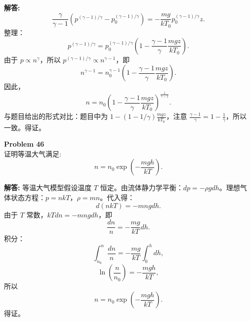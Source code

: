 \documentclass[12pt, a4paper, oneside]{ctexart}
\newenvironment{solution}{\par\noindent\textbf{解答:}\quad}{\par}
\begin{document}
\begin{solution}
    \[
    \frac{\gamma}{\gamma-1} \left( p^{(\gamma-1)/\gamma} - p_0^{(\gamma-1)/\gamma} \right) = -\frac{m g}{k T_0} p_0^{(\gamma-1)/\gamma} z.
    \]
    整理：
    \[
    p^{(\gamma-1)/\gamma} = p_0^{(\gamma-1)/\gamma} \left(1 - \frac{\gamma-1}{\gamma} \frac{m g z}{k T_0} \right).
    \]
    由于 $p \propto n^\gamma$，所以 $p^{(\gamma-1)/\gamma} \propto n^{\gamma-1}$，即
    \[
    n^{\gamma-1} = n_0^{\gamma-1} \left(1 - \frac{\gamma-1}{\gamma} \frac{m g z}{k T_0} \right).
    \]
    因此，
    \[
    n = n_0 \left(1 - \frac{\gamma-1}{\gamma} \frac{m g z}{k T_0} \right)^{\frac{1}{\gamma-1}}.
    \]
    与题目给出的形式对比：题目中为 $1 - (1 - 1/\gamma) \frac{m g z}{k T_0}$，注意 $\frac{\gamma-1}{\gamma} = 1 - \frac{1}{\gamma}$，所以一致。得证。
\end{solution}

\begin{mdframed}[backgroundcolor=gray!10, linewidth=0pt]
    \textbf{Problem 46} \\
    证明等温大气满足:
    \[
    n = n_0 \exp\left(-\frac{m g h}{k T}\right).
    \]
\end{mdframed}
\begin{solution}
    等温大气模型假设温度 $T$ 恒定。由流体静力学平衡：$dp = -\rho g dh$。理想气体状态方程：$p = n k T$，$\rho = m n$。代入得：
    \[
    d(n k T) = -m n g dh.
    \]
    由于 $T$ 常数，$k T dn = -m n g dh$，即
    \[
    \frac{dn}{n} = -\frac{m g}{k T} dh.
    \]
    积分：
    \[
    \int_{n_0}^{n} \frac{dn}{n} = -\frac{m g}{k T} \int_0^h dh,
    \]
    \[
    \ln\left(\frac{n}{n_0}\right) = -\frac{m g h}{k T},
    \]
    所以
    \[
    n = n_0 \exp\left(-\frac{m g h}{k T}\right).
    \]
    得证。
\end{solution}
\end{document}
